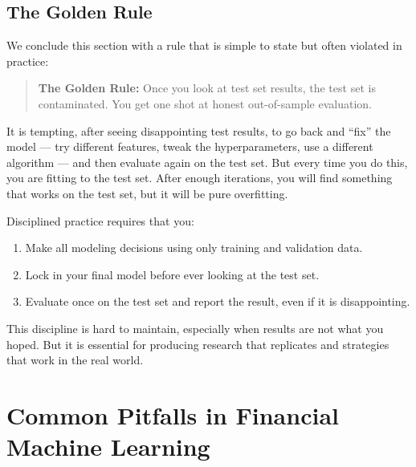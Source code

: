 \documentclass[11pt,a4paper]{article}
\begin{document}
\subsection{The Golden Rule}

We conclude this section with a rule that is simple to state but often violated in practice:

\begin{quote}
\textbf{The Golden Rule:} Once you look at test set results, the test set is contaminated. You get one shot at honest out-of-sample evaluation.
\end{quote}

It is tempting, after seeing disappointing test results, to go back and ``fix'' the model — try different features, tweak the hyperparameters, use a different algorithm — and then evaluate again on the test set. But every time you do this, you are fitting to the test set. After enough iterations, you will find something that works on the test set, but it will be pure overfitting.

Disciplined practice requires that you:
\begin{enumerate}
    \item Make all modeling decisions using only training and validation data.
    \item Lock in your final model before ever looking at the test set.
    \item Evaluate once on the test set and report the result, even if it is disappointing.
\end{enumerate}

This discipline is hard to maintain, especially when results are not what you hoped. But it is essential for producing research that replicates and strategies that work in the real world.


\section{Common Pitfalls in Financial Machine Learning}
\end{document}
